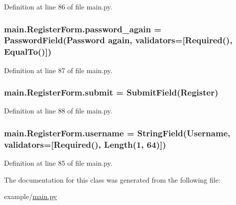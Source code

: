 Definition at line 86 of file main.\+py.

\subsubsection[{\texorpdfstring{password\+\_\+again}{password_again}}]{\setlength{\rightskip}{0pt plus 5cm}main.\+Register\+Form.\+password\+\_\+again = Password\+Field(\textquotesingle{}Password again\textquotesingle{}, validators=\mbox{[}Required(), Equal\+To(\textquotesingle{})\mbox{]})\hspace{0.3cm}{\ttfamily [static]}}\hypertarget{classmain_1_1RegisterForm_a045a58303acc98394aedb828655268ab}{}\label{classmain_1_1RegisterForm_a045a58303acc98394aedb828655268ab}


Definition at line 87 of file main.\+py.

\subsubsection[{\texorpdfstring{submit}{submit}}]{\setlength{\rightskip}{0pt plus 5cm}main.\+Register\+Form.\+submit = Submit\+Field(\textquotesingle{}Register\textquotesingle{})\hspace{0.3cm}{\ttfamily [static]}}\hypertarget{classmain_1_1RegisterForm_a1d788d2aac9c4ac25887eb8b2072d170}{}\label{classmain_1_1RegisterForm_a1d788d2aac9c4ac25887eb8b2072d170}


Definition at line 88 of file main.\+py.

\subsubsection[{\texorpdfstring{username}{username}}]{\setlength{\rightskip}{0pt plus 5cm}main.\+Register\+Form.\+username = String\+Field(\textquotesingle{}Username\textquotesingle{}, validators=\mbox{[}Required(), Length(1, 64)\mbox{]})\hspace{0.3cm}{\ttfamily [static]}}\hypertarget{classmain_1_1RegisterForm_a358e684fade440a73243b01b69778fe9}{}\label{classmain_1_1RegisterForm_a358e684fade440a73243b01b69778fe9}


Definition at line 85 of file main.\+py.



The documentation for this class was generated from the following file\+:\begin{DoxyCompactItemize}
\item 
example/\hyperlink{main_8py}{main.\+py}\end{DoxyCompactItemize}
